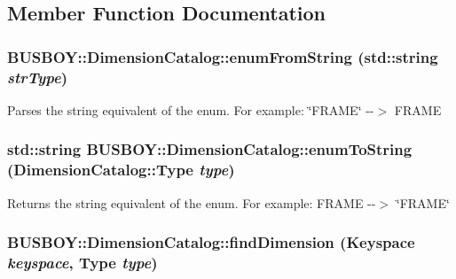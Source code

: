 \subsection{Member Function Documentation}
\hypertarget{classBUSBOY_1_1DimensionCatalog_a7b80af8f6cd357cc76d1b596c5de5186}{
\subsubsection[{enumFromString}]{ BUSBOY::DimensionCatalog::enumFromString (std::string {\em strType})}}
\label{classBUSBOY_1_1DimensionCatalog_a7b80af8f6cd357cc76d1b596c5de5186}


Parses the string equivalent of the enum. For example: \char`\"{}FRAME\char`\"{} -\/-\/$>$ FRAME \hypertarget{classBUSBOY_1_1DimensionCatalog_acc1daaa61dddcae60237d6905d85f1aa}{
\subsubsection[{enumToString}]{\setlength{\rightskip}{0pt plus 5cm}std::string BUSBOY::DimensionCatalog::enumToString ({\bf DimensionCatalog::Type} {\em type})}}
\label{classBUSBOY_1_1DimensionCatalog_acc1daaa61dddcae60237d6905d85f1aa}


Returns the string equivalent of the enum. For example: FRAME -\/-\/$>$ \char`\"{}FRAME\char`\"{} \hypertarget{classBUSBOY_1_1DimensionCatalog_a5af666f102931c8633ab2a41bdf8e57e}{
\subsubsection[{findDimension}]{ BUSBOY::DimensionCatalog::findDimension ({\bf Keyspace} {\em keyspace}, \/  {\bf Type} {\em type})}}
\label{classBUSBOY_1_1DimensionCatalog_a5af666f102931c8633ab2a41bdf8e57e}


